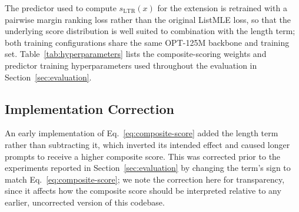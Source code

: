 The predictor used to compute $s_{\mathrm{LTR}}(x)$ for the extension is
retrained with a pairwise margin ranking loss rather than the original
ListMLE loss, so that the underlying score distribution is well suited to
combination with the length term; both training configurations share the same
OPT-125M backbone and training set. Table~\ref{tab:hyperparameters} lists the
composite-scoring weights and predictor training hyperparameters used
throughout the evaluation in Section~\ref{sec:evaluation}.




\subsection{Implementation Correction}
\label{subsec:sign-correction}

An early implementation of Eq.~\eqref{eq:composite-score} added the length
term rather than subtracting it, which inverted its intended effect and
caused longer prompts to receive a higher composite score. This was corrected
prior to the experiments reported in Section~\ref{sec:evaluation} by changing
the term's sign to match Eq.~\eqref{eq:composite-score}; we note the
correction here for transparency, since it affects how the composite score
should be interpreted relative to any earlier, uncorrected version of this
codebase.

